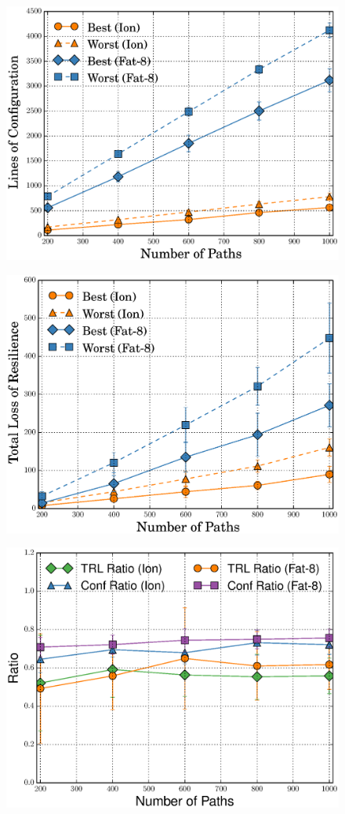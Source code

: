 \begin{figure}
	\centering
	\includegraphics[width=0.7\columnwidth]{figures/confMCMC.eps}
	\label{fig:confmcmc}
\end{figure}

\begin{figure}
	\centering
	\includegraphics[width=0.7\columnwidth]{figures/TRLMCMC.eps}
	\label{fig:trlmcmc}
\end{figure}

\begin{figure}
	\centering
	\includegraphics[width=0.7\columnwidth]{figures/ratioMCMC.eps}
	\label{fig:ratiomcmc}
\end{figure}




